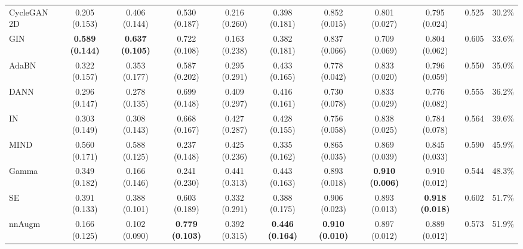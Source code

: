 \begin{table*}
{\begin{tabular}{lcccccccccc}
        CycleGAN 2D & 0.205 (0.153) & 0.406 (0.144) & 0.530 (0.187) & 0.216 (0.260) & 0.398 (0.181) & 0.852 (0.015) & 0.801 (0.027) & 0.795 (0.024) & 0.525 & 30.2\% \\
        
        GIN \cite{gin} & \textbf{0.589 (0.144)} & \textbf{0.637 (0.105)} & 0.722 (0.108) & 0.163 (0.238) & 0.382 (0.181) & 0.837 (0.066) & 0.709 (0.069) & 0.804 (0.062) & 0.605 & 33.6\% \\
        
        AdaBN \cite{adabn} & 0.322 (0.157) & 0.353 (0.177) & 0.587 (0.202) & 0.295 (0.291) & 0.433 (0.165) & 0.778 (0.042) & 0.833 (0.020) & 0.796 (0.059) & 0.550 & 35.0\% \\
        
        DANN \cite{dann_medim} & 0.296 (0.147) & 0.278 (0.135) & 0.699 (0.148) & 0.409 (0.297) & 0.416 (0.161) & 0.730 (0.078) & 0.833 (0.029) & 0.776 (0.082) & 0.555 & 36.2\% \\
        
        IN \cite{instance_norm} & 0.303 (0.149) & 0.308 (0.143) & 0.668 (0.167) & 0.427 (0.287) & 0.428 (0.155) & 0.756 (0.058) & 0.838 (0.025) & 0.784 (0.078) & 0.564 & 39.6\% \\
        
        MIND \cite{dg_tta} & 0.560 (0.171) & 0.588 (0.125) & 0.237 (0.148) & 0.425 (0.236) & 0.335 (0.162) & 0.865 (0.035) & 0.869 (0.039) & 0.845 (0.033) & 0.590 & 45.9\% \\
        
        Gamma          & 0.349 (0.182) & 0.166 (0.146) & 0.241 (0.230) & 0.441 (0.313) & 0.443 (0.163) & 0.893 (0.018) & \textbf{0.910 (0.006)} & 0.910 (0.012) & 0.544 & 48.3\% \\
        
        SE \cite{se_medim} & 0.391 (0.133) & 0.388 (0.101) & 0.603 (0.189) & 0.332 (0.291) & 0.388 (0.175) & 0.906 (0.023) & 0.893 (0.013) & \textbf{0.918 (0.018)} & 0.602 & 51.7\% \\
        
        nnAugm \cite{nnunet} & 0.166 (0.125) & 0.102 (0.090) & \textbf{0.779 (0.103)} & 0.392 (0.315) & \textbf{0.446 (0.164)} & \textbf{0.910 (0.010)} & 0.897 (0.012) & 0.889 (0.012) & 0.573 & 51.9\% \\
        
        

\end{tabular}}
\end{table*}
